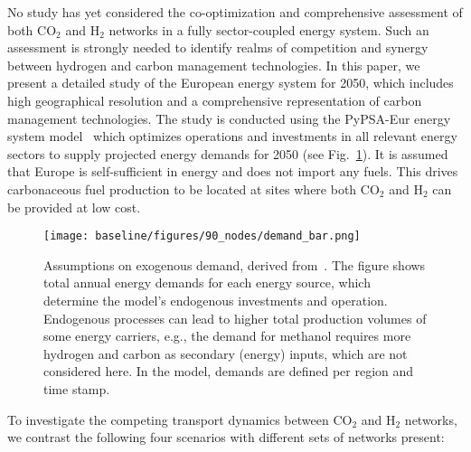 \documentclass[twocolumn]{article}
\newcommand{\carbon}{CO$_2$}
\newcommand{\hydrogen}{H$_2$}
\begin{document}
No study has yet considered the co-optimization and comprehensive assessment of both \carbon{} and \hydrogen{} networks in a fully sector-coupled energy system. Such an assessment is strongly needed to identify realms of competition and synergy between hydrogen and carbon management technologies. In this paper, we present a detailed study of the European energy system for 2050, which includes high geographical resolution and a comprehensive representation of carbon management technologies. The study is conducted using the PyPSA-Eur energy system model~\cite{brownPyPSAEurOpenSectorcoupled2023} which optimizes operations and investments in all relevant energy sectors to supply projected energy demands for 2050 (see Fig.~\ref{fig:total-demand-bar}). It is assumed that Europe is self-sufficient in energy and does not import any fuels. This drives carbonaceous fuel production to be located at sites where both \carbon{} and \hydrogen{} can be provided at low cost.

\begin{figure}[h!]
    \texttt{[image: baseline/figures/90\_nodes/demand\_bar.png]}
    \caption{Assumptions on exogenous demand, derived from~\cite{piamanzGeoreferencedIndustrialSites2018,muehlenpfordtTimeSeries2019,mantzosJRCIDEES20152018,NationalEmissionsReported2023,EurostatCompleteEnergyBalance,uwekrienDemandlib2023}. The figure shows total annual energy demands for each energy source, which determine the model's endogenous investments and operation. Endogenous processes can lead to higher total production volumes of some energy carriers, e.g., the demand for methanol requires more hydrogen and carbon as secondary (energy) inputs, which are not considered here. In the model, demands are defined per region and time stamp.}
    \label{fig:total-demand-bar}
\end{figure}




To investigate the competing transport dynamics between \carbon{} and \hydrogen{} networks, we contrast the following four scenarios with different sets of networks present:
%
\end{document}
